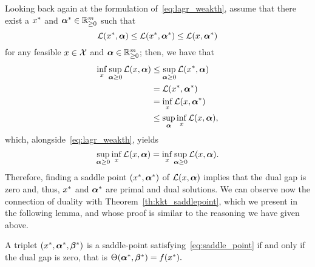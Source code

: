 Looking back again at the formulation of~\eqref{eq:lagr_weakth}, assume that there exist a ${x}^*$ and ${\bm{\alpha}}^* \in \mathbb{R}_{\geq 0}^{m}$ such that 
\begin{equation}
    \nonumber
    \mathcal{L}({x}^*, \bm{\alpha}) \leq \mathcal{L}({x}^*, {\bm{\alpha}}^*) \leq \mathcal{L}(x, {\bm{\alpha}}^*)
\end{equation}
for any feasible $x \in \mathcal{X}$ and $\bm{\alpha} \in  \mathbb{R}_{\geq 0}^m$; then, we have that 
\begin{equation}
    \nonumber
    \begin{aligned}
        \inf_{x} \sup_{\bm{\alpha} \geq 0} \mathcal{L}(x, \bm{\alpha}) &\leq \sup_{\bm{\alpha} \geq 0} \mathcal{L}({x}^*, \bm{\alpha}) \\
        & = \mathcal{L}({x}^*, {\bm{\alpha}}^*) \\
        & = \inf_{x} \mathcal{L}(x, {\bm{\alpha}}^*) \\
        & \leq \sup_{\bm{\alpha}} \inf_{x} \mathcal{L}(x, \bm{\alpha}), 
    \end{aligned}
\end{equation}
which, alongside~\eqref{eq:lagr_weakth}, yields 
\begin{equation}
    \label{eq:lagr_strongth}
    \sup_{\fv{\alpha} \geq 0} \inf_{x} \lagr(x, \fv{\alpha}) = \inf_{x} \sup_{\fv{\alpha} \geq 0} \lagr(x, \fv{\alpha}).
\end{equation}
Therefore, finding a saddle point $({x}^*, {\bm{\alpha}}^*)$ of $\mathcal{L}(x, \bm{\alpha})$ implies that the dual gap is zero and, thus, ${x}^*$ and ${\bm{\alpha}}^*$ are primal and dual solutions.
%
We can observe now the connection of duality with Theorem~\ref{th:kkt_saddlepoint}, which we present in the following lemma, and whose proof is similar to the reasoning we have given above.
\begin{lemma}
    A triplet $({x}^*, {\bm{\alpha}}^*, {\bm{\beta}}^*)$ is a saddle-point satisfying~\eqref{eq:saddle_point} if and only if the dual gap is zero, that is 
    $ \Theta({\bm{\alpha}}^*, {\bm{\beta}}^*) = f({x}^*) .$
\end{lemma}

